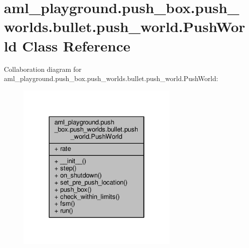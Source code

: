\hypertarget{classaml__playground_1_1push__box_1_1push__worlds_1_1bullet_1_1push__world_1_1_push_world}{\section{aml\-\_\-playground.\-push\-\_\-box.\-push\-\_\-worlds.\-bullet.\-push\-\_\-world.\-Push\-World Class Reference}
\label{classaml__playground_1_1push__box_1_1push__worlds_1_1bullet_1_1push__world_1_1_push_world}
}


Collaboration diagram for aml\-\_\-playground.\-push\-\_\-box.\-push\-\_\-worlds.\-bullet.\-push\-\_\-world.\-Push\-World\-:
\nopagebreak
\begin{figure}[H]
\begin{center}
\leavevmode
\includegraphics[width=226pt]{classaml__playground_1_1push__box_1_1push__worlds_1_1bullet_1_1push__world_1_1_push_world__coll__graph}
\end{center}
\end{figure}

